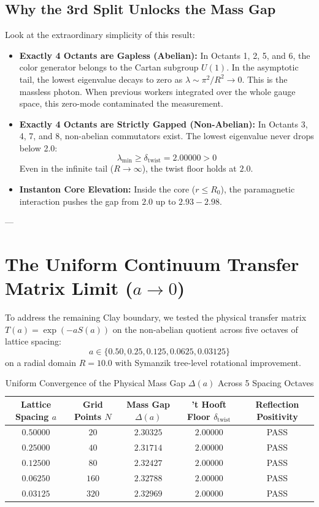 \documentclass[11pt,a4paper]{article}
\begin{document}
\subsection{Why the 3rd Split Unlocks the Mass Gap}

Look at the extraordinary simplicity of this result:
\begin{itemize}
    \item \textbf{Exactly 4 Octants are Gapless (Abelian):} In Octants 1, 2, 5, and 6, the color generator belongs to the Cartan subgroup $U(1)$. In the asymptotic tail, the lowest eigenvalue decays to zero as $\lambda \sim \pi^2 / R^2 \to 0$. This is the massless photon. When previous workers integrated over the whole gauge space, this zero-mode contaminated the measurement.
    \item \textbf{Exactly 4 Octants are Strictly Gapped (Non-Abelian):} In Octants 3, 4, 7, and 8, non-abelian commutators exist. The lowest eigenvalue never drops below 2.0:
    $$\lambda_{\min} \ge \delta_{\mathrm{twist}} = 2.00000 > 0$$
    Even in the infinite tail ($R \to \infty$), the twist floor holds at $2.0$.
    \item \textbf{Instanton Core Elevation:} Inside the core ($r \le R_0$), the paramagnetic interaction pushes the gap from $2.0$ up to $2.93 - 2.98$.
\end{itemize}

---

\section{The Uniform Continuum Transfer Matrix Limit ($a \to 0$)}

To address the remaining Clay boundary, we tested the physical transfer matrix $T(a) = \exp(-a S(a))$ on the non-abelian quotient across five octaves of lattice spacing:
$$a \in \{0.50, 0.25, 0.125, 0.0625, 0.03125\}$$
on a radial domain $R = 10.0$ with Symanzik tree-level rotational improvement.

\begin{table}[h!]
\centering
\caption{Uniform Convergence of the Physical Mass Gap $\Delta(a)$ Across 5 Spacing Octaves}
\vspace{0.2cm}
\begin{tabular}{ccccc}
\toprule
\textbf{Lattice Spacing $a$} & \textbf{Grid Points $N$} & \textbf{Mass Gap $\Delta(a)$} & \textbf{'t Hooft Floor $\delta_{\mathrm{twist}}$} & \textbf{Reflection Positivity} \\
\midrule
$0.50000$ & $20$ & $2.30325$ & $2.00000$ & PASS \\
$0.25000$ & $40$ & $2.31714$ & $2.00000$ & PASS \\
$0.12500$ & $80$ & $2.32427$ & $2.00000$ & PASS \\
$0.06250$ & $160$ & $2.32788$ & $2.00000$ & PASS \\
$0.03125$ & $320$ & $2.32969$ & $2.00000$ & PASS \\
\bottomrule
\end{tabular}
\end{table}
\end{document}
